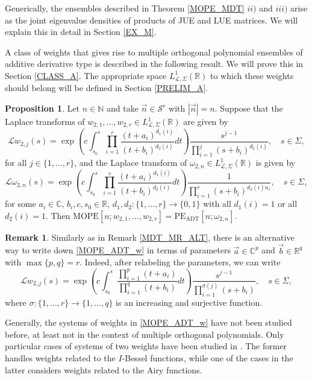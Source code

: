 \documentclass[a4paper,12pt,oneside]{article}
\theoremstyle{definition}
\newtheorem{prop}[defi]{Proposition}
\newtheorem{rem}[defi]{Remark}
\newcommand{\N}{\mathbb{N}}
\newcommand{\C}{\mathbb{C}}
\newcommand{\R}{\mathbb{R}}
\newcommand{\om}{\omega}
\newcommand{\sz}[1]{\left| \vec{#1} \right|}
\newcommand{\LT}[1]{\mathcal{L}#1}
\begin{document}
Generically, the ensembles described in Theorem \ref{MOPE_MDT} $ii)$ and $iii)$ arise as the joint eigenvalue densities of products of JUE and LUE matrices. We will explain this in detail in Section \ref{EX_M}.
\medbreak

A class of weights that gives rise to multiple orthogonal polynomial ensembles of additive derivative type is described in the following result. We will prove this in Section \ref{CLASS_A}. The appropriate space $L^1_{\LT{},\Sigma}(\R)$ to which these weights should belong will be defined in Section \ref{PRELIM_A}.

\begin{prop} \label{MOPE_ADT_w_om}
Let $n\in\N$ and take $\vec{n}\in\mathcal{S}^r$ with $\sz{n}=n$. Suppose that the Laplace transforms of $w_{2,1},\dots,w_{2,r}\in L^{1}_{\LT{},\Sigma}(\R)$ are given by
\begin{equation} \label{MOPE_ADT_w}
        \LT{w_{2,j}}(s) = \exp\left( c  \int_{s_0}^{s} \prod_{i=1}^r \frac{(t+a_i)^{d_1(i)}}{(t+b_i)^{d_2(i)}} dt \right) \frac{s^{j-1}}{\prod_{i=1}^{j} (s+b_i)^{d_2(i)}}, \quad s\in\Sigma,
\end{equation}
for all $j\in\{1,\dots,r\}$, and the Laplace transform of $\om_{2,n}\in L^{1}_{\LT{},\Sigma}(\R)$ is given by
\begin{equation} \label{MOPE_ADT_om}
    \LT{\om}_{2,n}(s) =  \exp\left( c  \int_{s_0}^{s} \prod_{i=1}^r \frac{(t+a_i)^{d_1(i)}}{(t+b_i)^{d_2(i)}} dt \right) \frac{1}{\prod_{i=1}^{r} (s+b_i)^{d_2(i) n_i }},\quad s\in\Sigma,
\end{equation}
for some $a_i\in\C$, $b_i,c,s_0\in\R$, $d_1,d_2:\{1,\dots,r\}\to\{0,1\}$ with all $d_1(i)=1$ or all $d_2(i)=1$. Then $\text{MOPE}[n;w_{2,1},\dots,w_{2,r}]=\text{PE}_{\text{ADT}}[n;\om_{2,n}]$.
\end{prop}

\begin{rem}
    Similarly as in Remark \ref{MDT_MR_ALT}, there is an alternative way to write down \eqref{MOPE_ADT_w} in terms of parameters $\vec{a}\in\C^p$ and $\vec{b}\in\R^q$ with $\max\{p,q\}=r$. Indeed, after relabeling the parameters, we can write    
        $$\LT{w_{2,j}}(s) = \exp\left( c  \int_{s_0}^{s} \frac{\prod_{i=1}^p (t+a_i)}{\prod_{i=1}^q (t+b_i)} dt \right) \frac{s^{j-1}}{\prod_{i=1}^{\sigma(j)} (s+b_i)}, \quad s\in\Sigma,$$
    where $\sigma:\{1,\dots,r\}\to\{1,\dots,q\}$ is an increasing and surjective function.
\end{rem}

Generally, the systems of weights in \eqref{MOPE_ADT_w} have not been studied before, at least not in the context of multiple orthogonal polynomials. Only particular cases of systems of two weights have been studied in \cite{CVA:MOP_IB,LVA}. The former handles weights related to the $I$-Bessel functions, while one of the cases in the latter considers weights related to the Airy functions.
\medbreak
\end{document}
